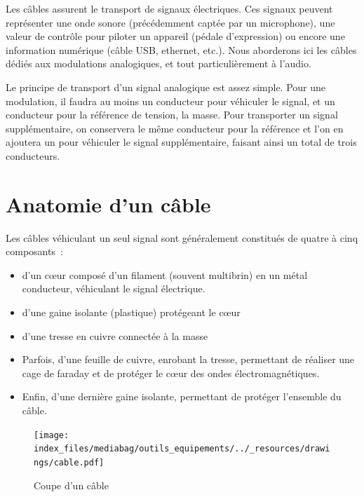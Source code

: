 \documentclass[
  letterpaper,
  DIV=11,
  numbers=noendperiod]{scrreprt}
\providecommand{\tightlist}{%
  \setlength{\itemsep}{0pt}\setlength{\parskip}{0pt}}\usepackage{longtable,booktabs,array}
\begin{document}
Les câbles assurent le transport de signaux électriques. Ces signaux
peuvent représenter une onde sonore (précédemment captée par un
microphone), une valeur de contrôle pour piloter un appareil (pédale
d'expression) ou encore une information numérique (câble USB, ethernet,
etc.). Nous aborderons ici les câbles dédiés aux modulations
analogiques, et tout particulièrement à l'audio.

Le principe de transport d'un signal analogique est assez simple. Pour
une modulation, il faudra au moins un conducteur pour véhiculer le
signal, et un conducteur pour la référence de tension, la masse. Pour
transporter un signal supplémentaire, on conservera le même conducteur
pour la référence et l'on en ajoutera un pour véhiculer le signal
supplémentaire, faisant ainsi un total de trois conducteurs.

\hypertarget{anatomie-dun-cuxe2ble}{%
\section{Anatomie d'un câble}\label{anatomie-dun-cuxe2ble}}

Les câbles véhiculant un seul signal sont généralement constitués de
quatre à cinq composants~:

\begin{itemize}
\tightlist
\item
  d'un cœur composé d'un filament (souvent multibrin) en un métal
  conducteur, véhiculant le signal électrique.
\item
  d'une gaine isolante (plastique) protégeant le cœur
\item
  d'une tresse en cuivre connectée à la masse
\item
  Parfois, d'une feuille de cuivre, enrobant la tresse, permettant de
  réaliser une cage de faraday et de protéger le cœur des ondes
  électromagnétiques.
\item
  Enfin, d'une dernière gaine isolante, permettant de protéger
  l'ensemble du câble.
\end{itemize}

\begin{figure}

{\centering \texttt{[image: index\_files/mediabag/outils\_equipements/../\_resources/drawings/cable.pdf]}

}

\caption{\label{fig-cable}Coupe d'un câble}

\end{figure}
\end{document}
